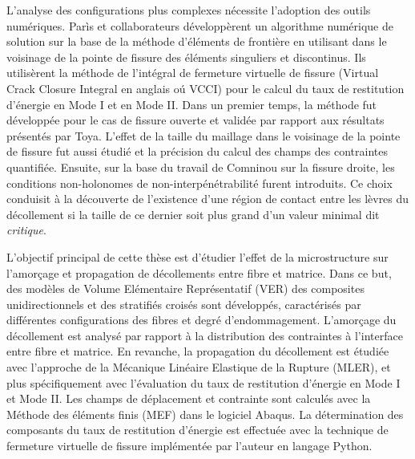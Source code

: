 L'analyse des configurations plus complexes n\'ecessite l'adoption des outils num\'eriques. Par\`is et collaborateurs d\'evelopp\`erent un algorithme num\'erique de solution sur la base de la m\'ethode d'\'el\'ements de fronti\`ere en utilisant dans le voisinage de la pointe de fissure des \'el\'ements singuliers et discontinus. Ils utilis\`erent la m\'ethode de l'int\'egral de fermeture virtuelle de fissure (Virtual Crack Closure Integral en anglais o\'u VCCI) pour le calcul du taux de restitution d'\'energie en Mode I et en Mode II. Dans un premier temps, la m\'ethode fut d\'evelopp\'ee pour le cas de fissure ouverte et valid\'ee par rapport aux r\'esultats pr\'esent\'es par Toya. L'effet de la taille du maillage dans le voisinage de la pointe de fissure fut aussi \'etudi\'e et la pr\'ecision du calcul des champs des contraintes quantifi\'ee. Ensuite, sur la base du travail de Comninou sur la fissure droite, les conditions non-holonomes de non-interp\'en\'etrabilit\'e furent introduits. Ce choix conduisit \`a la d\'ecouverte de l'existence d'une r\'egion de contact entre les l\`evres du d\'ecollement si la taille de ce dernier soit plus grand d'un valeur minimal dit \textit{critique}.

L'objectif principal de cette th\`ese est d'\'etudier l'effet de la microstructure sur l'amor\c{c}age et propagation de d\'ecollements entre fibre et matrice. Dans ce but, des mod\`eles de Volume El\'ementaire Repr\'esentatif (VER) des composites unidirectionnels et des stratifi\'es crois\'es sont d\'evelopp\'es, caract\'eris\'es par diff\'erentes configurations des fibres et degr\'e d'endommagement. L'amor\c{c}age du d\'ecollement est analys\'e par rapport \`a la distribution des contraintes \`a l'interface entre fibre et matrice. En revanche, la propagation du d\'ecollement est \'etudi\'ee avec l'approche de la M\'ecanique Lin\'eaire Elastique de la Rupture (MLER), et plus sp\'ecifiquement avec l'\'evaluation du taux de restitution d'\'energie en Mode I et Mode II. Les champs de d\'eplacement et contrainte sont calcul\'es avec la M\'ethode des \'el\'ements finis (MEF) dans le logiciel Abaqus. La d\'etermination des composants du taux de restitution d'\'energie est effectu\'ee avec la technique de fermeture virtuelle de fissure impl\'ement\'ee par l'auteur en langage Python.\\

